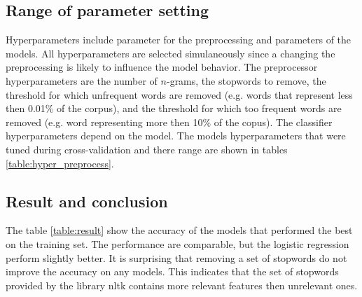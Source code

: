 \documentclass[10pt]{article}
\begin{document}
\subsection*{Range of parameter setting}

Hyperparameters include parameter for the preprocessing and parameters of the models. All hyperparameters are selected simulaneously since a changing the preprocessing is likely to influence the model behavior. The preprocessor hyperparameters are the number of $n$-grams, the stopwords to remove, the threshold for which unfrequent words are removed (e.g. words that represent less then 0.01\% of the corpus), and the threshold for which too frequent words are removed (e.g. word representing more then 10\% of the copus). The classifier hyperparameters depend on the model. The models hyperparameters that were tuned during cross-validation and there range are shown in tables \ref{table:hyper_preprocess}.

\begin{table}[h!]
    \caption{Range of hyperparameters}
    \label{table:hyper_preprocess}
\end{table}


\subsection*{Result and conclusion}
The table \ref{table:result} show the accuracy of the models that performed the best on the training set. The performance are comparable, but the logistic regression perform slightly better. It is surprising that removing a set of stopwords do not improve the accuracy on any models. This indicates that the set of stopwords provided by the library nltk contains more relevant features then unrelevant ones.
\end{document}
